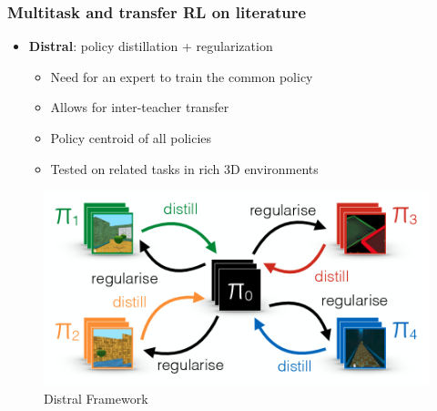 \documentclass{beamer}
\theoremstyle{remark}
\theoremstyle{plain}
\begin{document}
 \begin{frame}
  \frametitle{Multitask and transfer RL on literature}
  \begin{itemize}
      \item \textbf{Distral}: policy distillation + regularization \cite{Teh2017Distral:Learning}
      \begin{itemize}
          \item Need for an expert to train the common policy 
          \item Allows for inter-teacher transfer 
          \item Policy centroid of all policies
          \item Tested on related tasks in rich 3D environments
      \end{itemize}
  \end{itemize}
  \begin{figure}
      \centering
      \includegraphics[scale=0.2]{figs/distral.png}
      \caption{Distral Framework}
      \label{fig:my_label}
  \end{figure}
 \end{frame}
 
\end{document}
